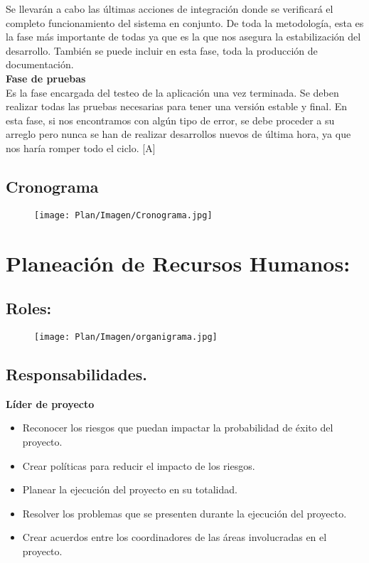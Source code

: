 Se llevarán a cabo las últimas acciones de integración donde se verificará el completo funcionamiento del sistema en conjunto. De toda la metodología, esta es la fase más importante de todas ya que es la que nos asegura la estabilización del desarrollo. También se puede incluir en esta fase, toda la producción de documentación. \\

\textbf{Fase de pruebas} \\

Es la fase encargada del testeo de la aplicación una vez terminada. Se deben realizar todas las pruebas necesarias para tener una versión estable y final. En esta fase, si nos encontramos con algún tipo de error, se debe proceder a su arreglo pero nunca se han de realizar desarrollos nuevos de última hora, ya que nos haría romper todo el ciclo. [A] \\
\newpage 

\subsection{Cronograma}
\begin{figure}[htbp!]
	\begin{center}
		\texttt{[image: Plan/Imagen/Cronograma.jpg]}
	\end{center}
\end{figure}

\newpage 

\section{Planeación de Recursos Humanos:}

\subsection{Roles:}
\begin{figure}[htbp!]
	\begin{center}
		\texttt{[image: Plan/Imagen/organigrama.jpg]}
	\end{center}
\end{figure}
\newpage 
\subsection{Responsabilidades.}


\textbf{Líder de proyecto}
\begin{itemize}
 \item Reconocer los riesgos que puedan impactar la probabilidad de éxito del proyecto.
 \item Crear políticas para reducir el impacto de los riesgos.
 \item Planear la ejecución del proyecto en su totalidad.
 \item Resolver los problemas que se presenten durante la ejecución del proyecto.
 \item Crear acuerdos entre los coordinadores de las áreas involucradas en el proyecto.\\
\end{itemize}

